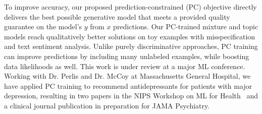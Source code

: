 \documentclass[11pt,letterpaper]{article}
\begin{document}
To improve accuracy, our proposed prediction-constrained (PC) objective directly delivers the best possible generative model that meets a provided quality guarantee on the model's $y$ from $x$ predictions.
Our PC-trained mixture and topic models reach qualitatively better solutions on toy examples with misspecification and text sentiment analysis. Unlike purely discriminative approaches, PC training can improve predictions by including many unlabeled examples, while boosting data likelihoods as well.
This work is under review at a major ML conference. 
Working with Dr. Perlis and Dr. McCoy at Massachusetts General Hospital, we have applied PC training to recommend antidepressants for patients with major depression, resulting in two papers in the NIPS Workshop on ML for Health~\citep{hughes2017clinicalPCsLDA, hughes2016clinicalSLDA} and a clinical journal publication in preparation for JAMA Psychiatry.
\end{document}
